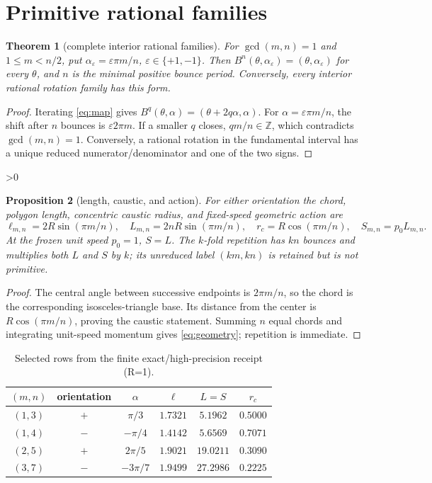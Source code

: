 \documentclass[10pt]{article}
\newtheorem{theorem}{Theorem}
\newtheorem{proposition}[theorem]{Proposition}
\begin{document}
\section{Primitive rational families}
\begin{theorem}[complete interior rational families]\label{thm:families}
For \(\gcd(m,n)=1\) and \(1\le m<n/2\), put
\(\alpha_\varepsilon=\varepsilon\pi m/n\),
\(\varepsilon\in\{+1,-1\}\).  Then
\(B^n(\theta,\alpha_\varepsilon)=(\theta,\alpha_\varepsilon)\) for every
\(\theta\), and \(n\) is the minimal positive bounce period.  Conversely,
every interior rational rotation family has this form.
\end{theorem}
\begin{proof}
Iterating \eqref{eq:map} gives
\(B^q(\theta,\alpha)=(\theta+2q\alpha,\alpha)\).
For \(\alpha=\varepsilon\pi m/n\), the shift after \(n\) bounces is
\(\varepsilon2\pi m\).  If a smaller \(q\) closes, \(qm/n\in\mathbb Z\),
which contradicts \(\gcd(m,n)=1\).  Conversely, a rational rotation in the
fundamental interval has a unique reduced numerator/denominator and one of
the two signs.
\end{proof}

\ifnum\CRevisionRound>0
\begin{proposition}[length, caustic, and action]\label{prop:geometry}
For either orientation the chord, polygon length, concentric caustic radius,
and fixed-speed geometric action are
\begin{equation}
 \ell_{m,n}=2R\sin(\pi m/n),\quad
 L_{m,n}=2nR\sin(\pi m/n),\quad
 r_c=R\cos(\pi m/n),\quad S_{m,n}=p_0L_{m,n}.          \label{eq:geometry}
\end{equation}
At the frozen unit speed \(p_0=1\), \(S=L\).  The \(k\)-fold repetition has
\(kn\) bounces and multiplies both \(L\) and \(S\) by \(k\); its unreduced
label \((km,kn)\) is retained but is not primitive.
\end{proposition}
\begin{proof}
The central angle between successive endpoints is \(2\pi m/n\), so the chord
is the corresponding isosceles-triangle base.  Its distance from the center is
\(R\cos(\pi m/n)\), proving the caustic statement.  Summing \(n\) equal
chords and integrating unit-speed momentum gives \eqref{eq:geometry}; repetition
is immediate.
\end{proof}
\fi

\begin{table}[t]
\centering\small
\caption{Selected rows from the finite exact/high-precision receipt (R=1).}
\begin{tabular}{c|c|c|c|c|c}
\toprule
$(m,n)$ & orientation & $\alpha$ & $\ell$ & $L=S$ & $r_c$\\
\midrule
$(1,3)$ & $+$ & $\pi/3$ & $1.7321$ & $5.1962$ & $0.5000$\\
$(1,4)$ & $-$ & $-\pi/4$ & $1.4142$ & $5.6569$ & $0.7071$\\
$(2,5)$ & $+$ & $2\pi/5$ & $1.9021$ & $19.0211$ & $0.3090$\\
$(3,7)$ & $-$ & $-3\pi/7$ & $1.9499$ & $27.2986$ & $0.2225$\\
\bottomrule
\end{tabular}
\end{table}
\end{document}
